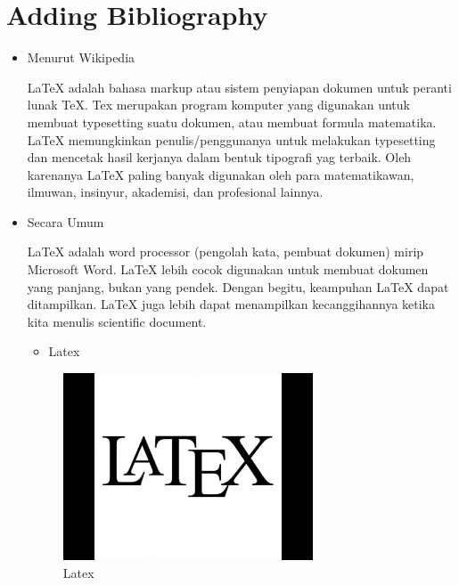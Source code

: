  \section{Adding Bibliography}
 
\begin{itemize}
	\item Menurut Wikipedia \par

LaTeX adalah bahasa markup atau sistem penyiapan dokumen untuk peranti lunak TeX. Tex merupakan program komputer yang digunakan untuk membuat typesetting suatu dokumen, atau membuat formula matematika. LaTeX memungkinkan penulis/penggunanya untuk melakukan typesetting dan mencetak hasil kerjanya dalam bentuk tipografi yag terbaik. Oleh karenanya LaTeX paling banyak digunakan oleh para matematikawan, ilmuwan, insinyur, akademisi, dan profesional lainnya.\par

	\item Secara Umum\par

LaTeX adalah word processor (pengolah kata, pembuat dokumen) mirip Microsoft Word. LaTeX lebih cocok digunakan untuk membuat dokumen yang panjang, bukan yang pendek. Dengan begitu, keampuhan LaTeX dapat ditampilkan. LaTeX juga lebih dapat menampilkan kecanggihannya ketika kita menulis scientific document.\par
\vspace{\baselineskip}

\begin{itemize}
	\item Latex
\end{itemize}
 \begin{figure}[ht]
	\centerline{\includegraphics[width=0.70\textwidth]{gambar/Latex}}
	\caption{Latex}
	\label{Latex}
\end{figure}


\end{itemize}
